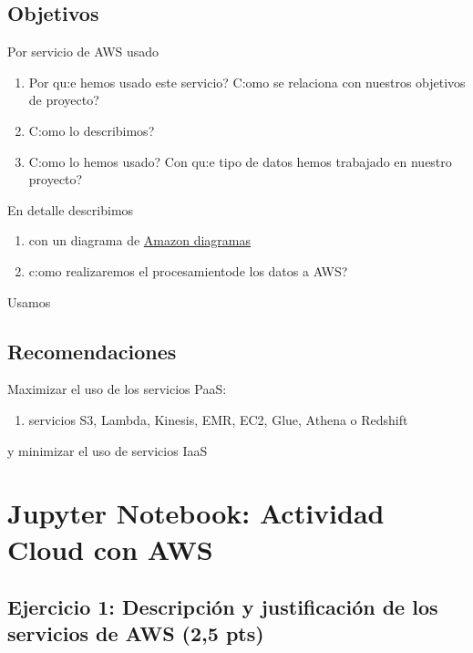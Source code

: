 \documentclass{article}
\begin{document}
\subsection*{Objetivos}
Por servicio de AWS usado
\begin{enumerate}
    \item Por qu:e hemos usado este servicio? C:omo se relaciona con nuestros objetivos de proyecto?
    \item C:omo lo describimos?
    \item C:omo lo hemos usado? Con qu:e tipo de datos hemos trabajado en nuestro proyecto?
\end{enumerate}
En detalle describimos
\begin{enumerate}
    \item con un diagrama de \href{https://aws.amazon.com/es/architecture/icons/}{Amazon diagramas}
    \item c:omo realizaremos el procesamientode los datos a AWS?
\end{enumerate}
Usamos 



\subsection*{Recomendaciones}
\lipsum[4-4]
Maximizar el uso de los servicios PaaS:
\begin{enumerate}
    \item servicios S3, Lambda, Kinesis, EMR, EC2, Glue, Athena o Redshift
\end{enumerate}
y minimizar el uso de servicios IaaS

\newpage 
\section{Jupyter Notebook: Actividad Cloud con AWS}
\subsection{Ejercicio 1: Descripción y justificación de los servicios de AWS (2,5 pts)}
\end{document}

